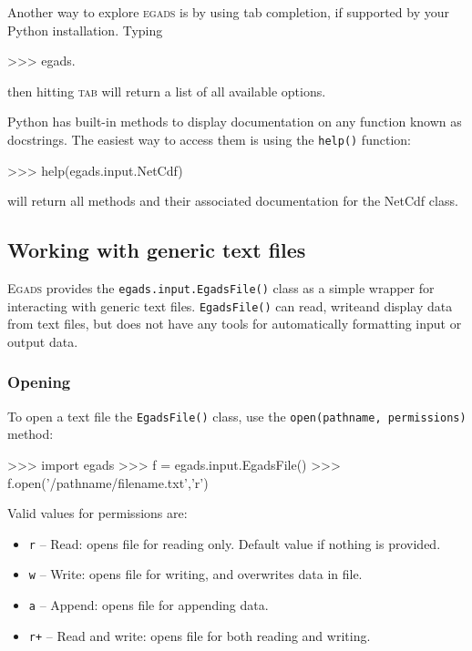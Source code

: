\documentclass[a4paper,11pt]{report}
\newcommand{\egads}{\textsc{egads} }
\newcommand{\Egads}{\textsc{Egads} }
\begin{document}
Another way to explore \egads is by using tab completion, if supported by your Python installation. Typing 

\begin{command}
    >>> egads.
\end{command}
then hitting \textsc{tab} will return a list of all available options. 

Python has built-in methods to display documentation on any function known as docstrings. 
The easiest way to access them is using the \verb|help()| function:

\begin{command}
   >>> help(egads.input.NetCdf)
\end{command}
will return all methods and their associated documentation for the NetCdf class.



\subsection{Working with generic text files}

\Egads provides the \verb|egads.input.EgadsFile()| class as a simple wrapper for interacting with 
generic text files. \verb|EgadsFile()| can read, writeand display data from text files, but does 
not have any tools for automatically formatting input or output data. 

\subsubsection{Opening}

To open a text file the \verb|EgadsFile()| class, use the
\verb|open(pathname, permissions)| method:

\begin{command}
    >>> import egads
    >>> f = egads.input.EgadsFile()
    >>> f.open('/pathname/filename.txt','r')
\end{command}
%
Valid values for permissions are:

\begin{itemize}
 \item \verb|r| -- Read: opens file for reading only. Default value if nothing is provided.
 \item \verb|w| -- Write: opens file for writing, and overwrites data in file.
 \item \verb|a| -- Append: opens file for appending data.
 \item \verb|r+| -- Read and write: opens file for both reading and writing.
\end{itemize}
\end{document}
